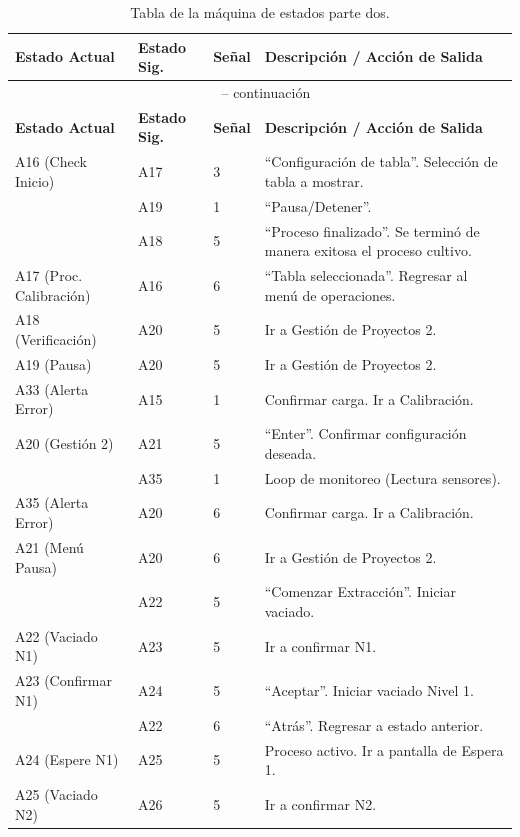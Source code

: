 \documentclass[11pt,tesis,twoside,openright,spanish]{upiiztt}
\begin{document}
\begin{longtable}{p{2.5cm}p{1.5cm}p{1.5cm}p{7cm}}
\caption{Tabla de la máquina de estados parte dos.}
\label{tab:estados2}\\
\toprule
\textbf{Estado Actual} & \textbf{Estado Sig.} & \textbf{Señal} & \textbf{Descripción / Acción de Salida} \\
\midrule
\endfirsthead
\multicolumn{4}{c}{\tablename\ \thetable{} -- continuación}\\
\toprule
\textbf{Estado Actual} & \textbf{Estado Sig.} & \textbf{Señal} & \textbf{Descripción / Acción de Salida} \\
\midrule
\endhead
\bottomrule
\endfoot
A16 (Check Inicio)  & A17 & 3 & ``Configuración de tabla''. Selección de tabla a mostrar. \\
                    & A19 & 1 & ``Pausa/Detener''. \\
                    & A18 & 5 & ``Proceso finalizado''. Se terminó de manera exitosa el proceso cultivo. \\
A17 (Proc. Calibración) & A16 & 6 & ``Tabla seleccionada''. Regresar al menú de operaciones. \\
A18 (Verificación)  & A20 & 5 & Ir a Gestión de Proyectos 2. \\
A19 (Pausa)         & A20 & 5 & Ir a Gestión de Proyectos 2. \\
A33 (Alerta Error)  & A15 & 1 & Confirmar carga. Ir a Calibración. \\
A20 (Gestión 2)     & A21 & 5 & ``Enter''. Confirmar configuración deseada. \\
                    & A35 & 1 & Loop de monitoreo (Lectura sensores). \\
A35 (Alerta Error)  & A20 & 6 & Confirmar carga. Ir a Calibración. \\
A21 (Menú Pausa)    & A20 & 6 & Ir a Gestión de Proyectos 2. \\
                    & A22 & 5 & ``Comenzar Extracción''. Iniciar vaciado. \\
A22 (Vaciado N1)    & A23 & 5 & Ir a confirmar N1. \\
A23 (Confirmar N1)  & A24 & 5 & ``Aceptar''. Iniciar vaciado Nivel 1. \\
                    & A22 & 6 & ``Atrás''. Regresar a estado anterior. \\
A24 (Espere N1)     & A25 & 5 & Proceso activo. Ir a pantalla de Espera 1. \\
A25 (Vaciado N2)    & A26 & 5 & Ir a confirmar N2. \\

\end{longtable}
\end{document}
